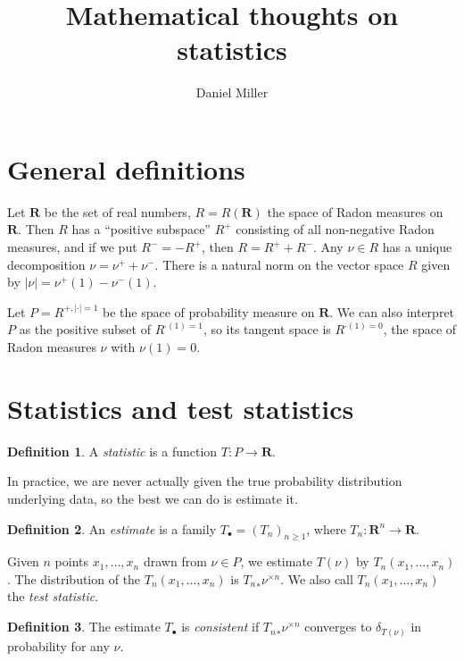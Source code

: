 \documentclass{article}
\title{Mathematical thoughts on statistics}
\author{Daniel Miller}
\newcommand{\bR}{\mathbf{R}}
\theoremstyle{definition}
\newtheorem{definition}{Definition}
\begin{document}
\maketitle





\section{General definitions}

Let $\bR$ be the set of real numbers, $R=R(\bR)$ the space of Radon measures on 
$\bR$. Then $R$ has a ``positive subspace'' $R^+$ consisting of all 
non-negative Radon measures, and if we put $R^-=-R^+$, then $R=R^++R^-$. Any 
$\nu\in R$ has a unique decomposition $\nu = \nu^++\nu^-$. There is a natural 
norm on the vector space $R$ given by $|\nu| = \nu^+(1) - \nu^-(1)$. 

Let $P=R^{+,|\cdot|=1}$ be the space of probability measure on $\bR$. We can 
also interpret $P$ as the positive subset of $R^{\cdot(1)=1}$, so its tangent 
space is $R^{\cdot(1)=0}$, the space of Radon measures $\nu$ with 
$\nu(1) = 0$. 





\section{Statistics and test statistics}

\begin{definition}
A \emph{statistic} is a function $T\colon P\to \bR$. 
\end{definition}

In practice, we are never actually given the true probability distribution 
underlying data, so the best we can do is estimate it. 

\begin{definition}
An \emph{estimate} is a family $T_\bullet = (T_n)_{n\geqslant 1}$, where 
$T_n\colon \bR^n \to \bR$. 
\end{definition}

Given $n$ points $x_1,\dots,x_n$ drawn from $\nu\in P$, we estimate 
$T(\nu)$ by $T_n(x_1,\dots,x_n)$. The distribution of the $T_n(x_1,\dots,x_n)$ 
is ${T_n}_\ast \nu^{\times n}$. We also call $T_n(x_1,\dots,x_n)$ the 
\emph{test statistic}. 

\begin{definition}
The estimate $T_\bullet$ is \emph{consistent} if ${T_n}_\ast\nu^{\times n}$ 
converges to $\delta_{T(\nu)}$ in probability for any $\nu$. 
\end{definition}
\end{document}

